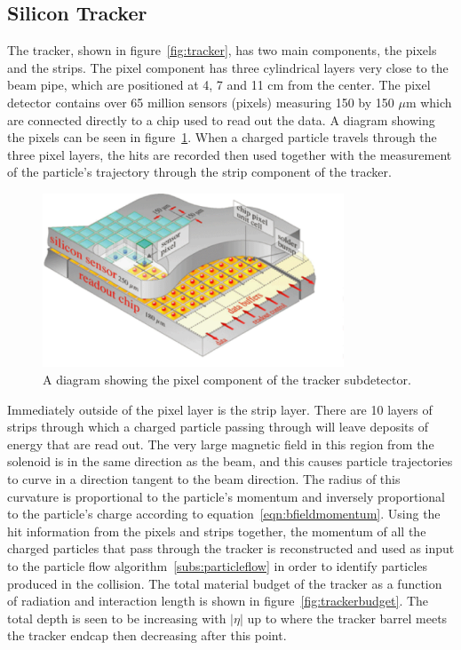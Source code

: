 \subsection{Silicon Tracker}
\label {subs:tracker}
The tracker, shown in figure~\ref{fig:tracker}, has two main components, the pixels and the strips.
The pixel component has three cylindrical layers very close to the beam pipe, which are positioned at 4, 7 and 11 cm from the center.
The pixel detector contains over 65 million sensors (pixels) measuring 150 by 150 $\mu$m which are connected directly to a chip used to read out the data.
A diagram showing the pixels can be seen in figure~\ref{fig:pixels}.
When a charged particle travels through the three pixel layers,
the hits are recorded then used together with the measurement of the particle's trajectory through the strip component of the tracker.

\begin{figure}[!htb]
  \begin{center}
    \includegraphics[width=0.8\textwidth]{cms/figs/Pixelement.pdf}
    \caption{
      \label{fig:pixels}
      A diagram showing the pixel component of the tracker subdetector.
    }
  \end{center}
\end{figure}

Immediately outside of the pixel layer is the strip layer.
There are 10 layers of strips through which a charged particle passing through will leave deposits of energy that are read out.
The very large magnetic field in this region from the solenoid is in the same direction as the beam,
and this causes particle trajectories to curve in a direction tangent to the beam direction. 
The radius of this curvature is proportional to the particle's momentum and inversely proportional to the particle's charge according to equation~\ref{eqn:bfieldmomentum}.
Using the hit information from the pixels and strips together,
the momentum of all the charged particles that pass through the tracker is reconstructed and
used as input to the particle flow algorithm~\ref{subs:particleflow} in order to identify particles produced in the collision.
The total material budget of the tracker as a function of radiation and interaction length is shown in figure~\ref{fig:trackerbudget}.
The total depth is seen to be increasing with $|\eta|$ up to where the tracker barrel meets the tracker endcap then decreasing after this point.

